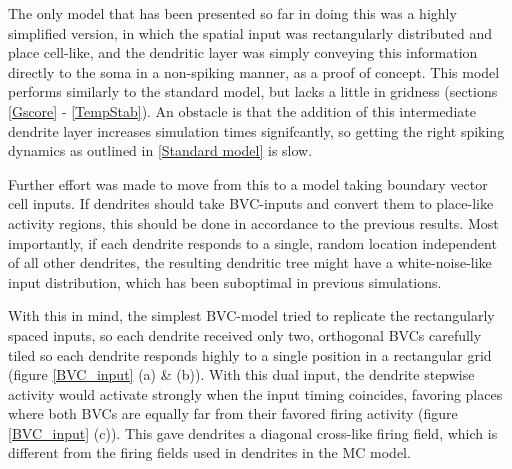\documentclass{article}
\begin{document}
    The only model that has been presented so far in doing this was a highly simplified version, in which the spatial input was rectangularly distributed and place cell-like, and the dendritic layer was simply conveying this information directly to the soma in a non-spiking manner, as a proof of concept. This model performs similarly to the standard model, but lacks a little in gridness (sections \ref{Gscore} - \ref{TempStab}). An obstacle is that the addition of this intermediate dendrite layer increases simulation times signifcantly, so getting the right spiking dynamics as outlined in \ref{Standard model} is slow.

    Further effort was made to move from this to a model taking boundary vector cell inputs. If dendrites should take BVC-inputs and convert them to place-like activity regions, this should be done in accordance to the previous results. Most importantly, if each dendrite responds to a single, random location independent of all other dendrites, the resulting dendritic tree might have a white-noise-like input distribution, which has been suboptimal in previous simulations.

    With this in mind, the simplest BVC-model tried to replicate the rectangularly spaced inputs, so each dendrite received only two, orthogonal BVCs carefully tiled so each dendrite responds highly to a single position in a rectangular grid (figure \ref{BVC_input} (a) \& (b)). With this dual input, the dendrite stepwise activity would activate strongly when the input timing coincides, favoring places where both BVCs are equally far from their favored firing activity (figure \ref{BVC_input} (c)). This gave dendrites a diagonal cross-like firing field, which is different from the firing fields used in dendrites in the MC model.
\end{document}
